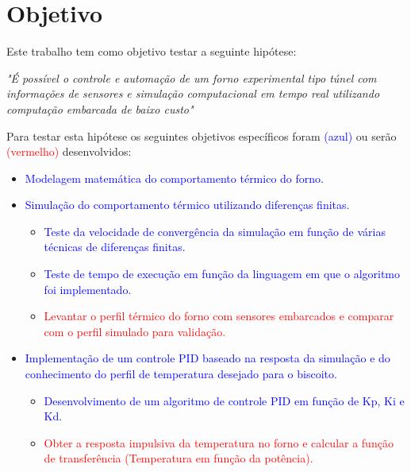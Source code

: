 \chapter{Objetivo}\label{objetivo}

Este trabalho tem como objetivo testar a seguinte hipótese:

\textit{"É possível o controle e automação de um forno experimental tipo túnel com informações de sensores e simulação computacional em tempo real utilizando computação embarcada de baixo custo"}

Para testar esta hipótese os seguintes objetivos específicos foram \textcolor{blue}{(azul)} ou serão \textcolor{red}{(vermelho)} desenvolvidos:

\begin{itemize}

    \item \textcolor{blue}{Modelagem matemática do comportamento térmico do forno.}
  
    \item \textcolor{blue}{Simulação do comportamento térmico utilizando diferenças finitas.}
  
    \begin{itemize}
    
        \item \textcolor{blue}{Teste da velocidade de convergência da simulação em função de várias técnicas de diferenças finitas.}
    
        \item \textcolor{blue}{Teste de tempo de execução em função da linguagem em que o algoritmo foi implementado.}
    
        \item \textcolor{red}{Levantar o perfil térmico do forno com sensores embarcados e comparar com o perfil simulado para validação.}
    
    \end{itemize}

    \item \textcolor{blue}{Implementação de um controle PID baseado na resposta da simulação e do conhecimento do perfil de temperatura desejado para o biscoito.}   
   
    \begin{itemize}
    
        \item \textcolor{blue}{Desenvolvimento de um algoritmo de controle PID em função de Kp, Ki e Kd.} 
    
        \item \textcolor{red}{Obter a resposta impulsiva da temperatura no forno e 	calcular a função de transferência (Temperatura em função da 	potência).}


\end{itemize}
\end{itemize}

